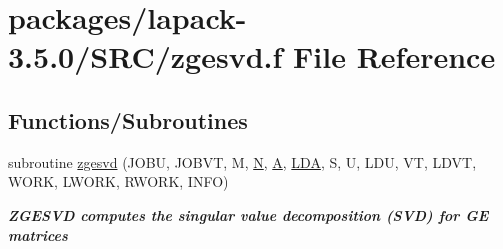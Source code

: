 \hypertarget{zgesvd_8f}{}\section{packages/lapack-\/3.5.0/\+S\+R\+C/zgesvd.f File Reference}
\label{zgesvd_8f}
\subsection*{Functions/\+Subroutines}
\begin{DoxyCompactItemize}
\item 
subroutine \hyperlink{group__complex16GEsing_gad6f0c85f3cca2968e1ef901d2b6014ee}{zgesvd} (J\+O\+B\+U, J\+O\+B\+V\+T, M, \hyperlink{polmisc_8c_a0240ac851181b84ac374872dc5434ee4}{N}, \hyperlink{classA}{A}, \hyperlink{example__user_8c_ae946da542ce0db94dced19b2ecefd1aa}{L\+D\+A}, S, U, L\+D\+U, V\+T, L\+D\+V\+T, W\+O\+R\+K, L\+W\+O\+R\+K, R\+W\+O\+R\+K, I\+N\+F\+O)
\begin{DoxyCompactList}\small\item\em {\bfseries  Z\+G\+E\+S\+V\+D computes the singular value decomposition (S\+V\+D) for G\+E matrices} \end{DoxyCompactList}\end{DoxyCompactItemize}
